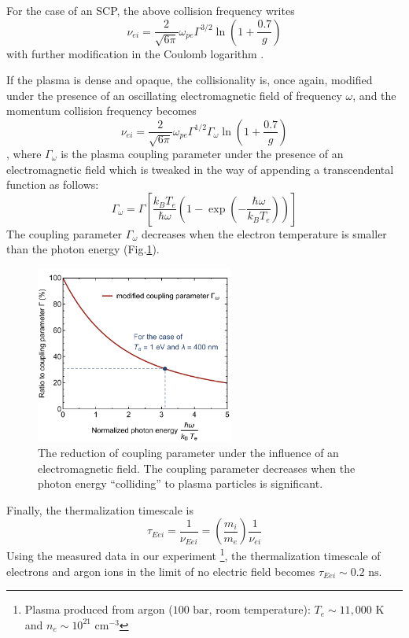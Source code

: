 For the case of an SCP, the above collision frequency writes 
\begin{equation}
\nu_{ei} = \frac{2}{\sqrt{6\pi}} \omega_{pe} \Gamma^{3/2} \ln{ \left( 1+ \frac{0.7}{g} \right)}
\end{equation}
with further modification in the Coulomb logarithm \cite{dimonte2008molecular, bataller2014blackbody, zel2002physics}.

If the plasma is dense and opaque, the collisionality is, once again, modified under the presence of an oscillating electromagnetic field of frequency $\omega$, and the momentum collision frequency becomes
\begin{equation}
\nu_{ei} = \frac{2}{\sqrt{6\pi}} \omega_{pe} \Gamma^{1/2} \Gamma_\omega \ln{ \left( 1+ \frac{0.7}{g} \right)}
\end{equation}
, where $\Gamma_\omega$ is the plasma coupling parameter under the presence of an electromagnetic field which is tweaked in the way of appending a transcendental function as follows:
\begin{equation}
\Gamma_{\omega}=\Gamma\left[\frac{k_{B} T_e}{\hbar \omega}\left(1-\exp \left(-\frac{\hbar \omega}{k_{B} T_e}\right)\right)\right]
\end{equation}
The coupling parameter $\Gamma_\omega$ decreases when the electron temperature is smaller than the photon energy (Fig.\ref{fig:modifiedGamma}).

\begin{figure}[ht!]
\centering
\includegraphics[width=65mm]{figures/ch3/modified/modifiedGamma.pdf}
\caption{The reduction of coupling parameter under the influence of an electromagnetic field. The coupling parameter decreases when the photon energy ``colliding'' to plasma particles is significant.}
\label{fig:modifiedGamma}
\end{figure}

Finally, the thermalization timescale is
\begin{equation}
\tau_{Eei} = \frac{1}{\nu_{Eei}} = \left( \frac{m_i}{m_e} \right) \frac{1}{\nu_{ei}}
\end{equation}
Using the measured data in our experiment \footnote{Plasma produced from argon ($100 \text{ bar}$, room temperature): $T_e \sim 11,000 \text{ K}$ and $n_e \sim 10^{21} \text{ cm}^{-3}$}, the thermalization timescale of electrons and argon ions in the limit of no electric field becomes $\tau_{Eei} \sim 0.2 \text{ ns}$.



